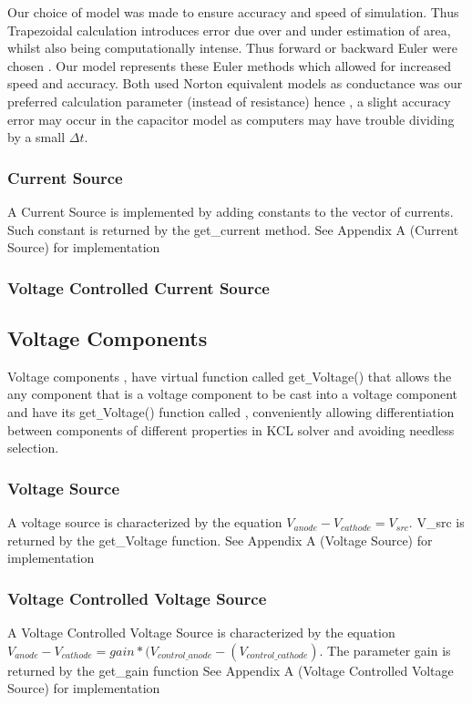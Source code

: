 \documentclass{article}
\begin{document}
Our choice of model was made to ensure accuracy and speed of simulation. Thus Trapezoidal calculation introduces error due over and under estimation of area, whilst also being computationally intense. Thus forward or backward Euler were chosen . Our model represents these Euler methods which allowed for increased speed and accuracy. Both used Norton equivalent models as conductance was our preferred calculation parameter (instead of resistance) hence , a slight accuracy error may occur in the capacitor model as computers may have trouble dividing by a small $\Delta t$.



\subsubsection{Current Source}
A Current Source is implemented by adding constants to the vector of currents. Such constant is returned by the get\_current method.\bigbreak
See Appendix A (Current Source) for implementation
\subsubsection{Voltage Controlled Current Source}
\subsection{Voltage Components}
Voltage components , have virtual function called get\verb|_|Voltage() that allows the any component that is a voltage component to be cast into a voltage component and have its get\verb|_|Voltage() function called , conveniently allowing differentiation between components of different properties in KCL solver and avoiding needless selection.
\medbreak

\subsubsection{Voltage Source}
A voltage source is characterized by the equation $V_{anode}-V_{cathode}=V_{src}$. V_{src} is returned by the get\_Voltage function.\bigbreak
See Appendix A (Voltage Source) for implementation

\subsubsection{Voltage Controlled Voltage Source}
A Voltage Controlled Voltage Source is characterized by the equation
$V_{anode}-V_{cathode}=gain*(V_{control\_anode}-(V_{control\_cathode})$.
The parameter gain is returned by the get\_gain function\bigbreak
See Appendix A (Voltage Controlled Voltage Source) for implementation
\end{document}
